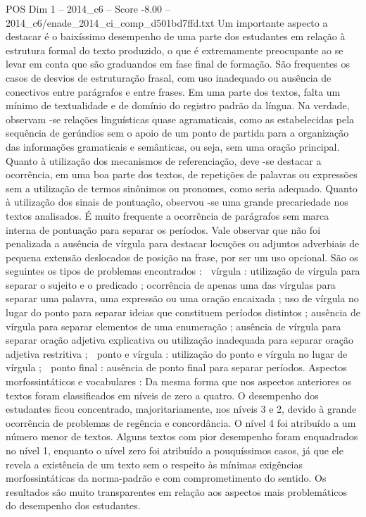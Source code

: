 \begin{textsample}{POS Dim 1 – 2014\_c6 – Score -8.00 – 2014\_c6/enade\_2014\_ci\_comp\_d501bd7ffd.txt}
Um importante aspecto a destacar é o baixíssimo desempenho de uma parte dos estudantes em relação à estrutura formal do texto produzido, o que é extremamente preocupante ao se levar em conta que são graduandos em fase final de formação.
São frequentes os casos de desvios de estruturação frasal, com uso inadequado ou ausência de conectivos entre parágrafos e entre frases.
Em uma parte dos textos, falta um mínimo de textualidade e de domínio do registro padrão da língua.
Na verdade, observam -se relações linguísticas quase agramaticais, como as estabelecidas pela sequência de gerúndios sem o apoio de um ponto de partida para a organização das informações gramaticais e semânticas, ou seja, sem uma oração principal.
Quanto à utilização dos mecanismos de referenciação, deve -se destacar a ocorrência, em uma boa parte dos textos, de repetições de palavras ou expressões sem a utilização de termos sinônimos ou pronomes, como seria adequado.
Quanto à utilização dos sinais de pontuação, observou -se uma grande precariedade nos textos analisados.
É muito frequente a ocorrência de parágrafos sem marca interna de pontuação para separar os períodos.
Vale observar que não foi penalizada a ausência de vírgula para destacar locuções ou adjuntos adverbiais de pequena extensão deslocados de posição na frase, por ser um uso opcional.
São os seguintes os tipos de problemas encontrados :  vírgula : utilização de vírgula para separar o sujeito e o predicado ; ocorrência de apenas uma das vírgulas para separar uma palavra, uma expressão ou uma oração encaixada ; uso de vírgula no lugar do ponto para separar ideias que constituem períodos distintos ; ausência de vírgula para separar elementos de uma enumeração ; ausência de vírgula para separar oração adjetiva explicativa ou utilização inadequada para separar oração adjetiva restritiva ;  ponto e vírgula : utilização do ponto e vírgula no lugar de vírgula ;  ponto final : ausência de ponto final para separar períodos.
Aspectos morfossintáticos e vocabulares : Da mesma forma que nos aspectos anteriores os textos foram classificados em níveis de zero a quatro.
O desempenho dos estudantes ficou concentrado, majoritariamente, nos níveis 3 e 2, devido à grande ocorrência de problemas de regência e concordância.
O nível 4 foi atribuído a um número menor de textos.
Alguns textos com pior desempenho foram enquadrados no nível 1, enquanto o nível zero foi atribuído a pouquíssimos casos, já que ele revela a existência de um texto sem o respeito às mínimas exigências morfossintáticas da norma-padrão e com comprometimento do sentido.
Os resultados são muito transparentes em relação aos aspectos mais problemáticos do desempenho dos estudantes.

\end{textsample}
